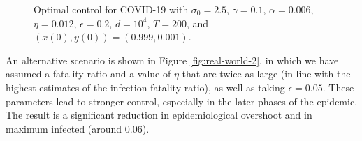 \documentclass[english,12pt,letter]{article}
\newcommand{\Rnot}{\sigma_0}
\begin{document}
\begin{figure}
    \centering
    \caption{Optimal control for COVID-19 with $\Rnot=2.5$, $\gamma=0.1$,
                $\alpha=0.006$, $\eta=0.012$, $\epsilon=0.2$, $d=10^4$, $T=200$, and $(x(0),y(0)) =
                (0.999,0.001)$.\label{fig:real-world-1}}
\end{figure}

An alternative scenario is shown in Figure \ref{fig:real-world-2}, in which
we have assumed a fatality ratio and a value of $\eta$ that are twice as
large (in line with the highest estimates of the infection fatality ratio),
as well as taking $\epsilon=0.05$.  These parameters lead to stronger control,
especially in the later phases of the epidemic.
The result is a significant reduction in epidemiological overshoot and in
maximum infected (around $0.06$).
\end{document}

